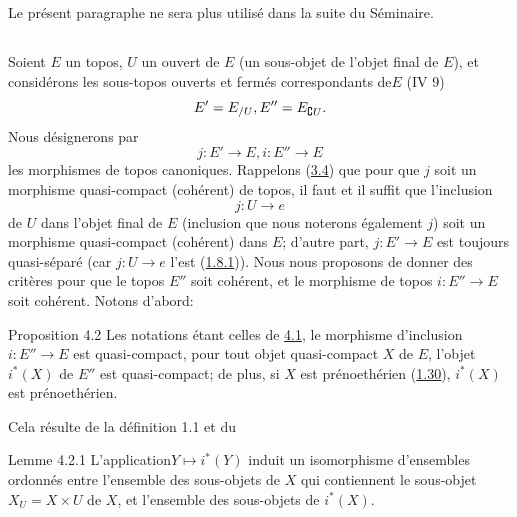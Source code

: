 \documentclass[10pt]{../fichiers-configuration-latex/smfart}
\begin{document}
Le présent paragraphe ne sera plus utilisé dans la suite du Séminaire.

\subsection{}
Soient $E$ un topos, $U$ un ouvert de $E$ (\ie un sous-objet de
l'objet final de $E$), et considérons les sous-topos ouverts et fermés
correspondants de\pageoriginale $E$ (IV 9)
$$
E'= E_{/U}, E'' = E_{\complement U}{}.
$$
Nous désignerons par
$$
j : E'\to E, i : E''\to E
$$
les morphismes de topos canoniques. Rappelons (\hyperref[VI.prop3.4]{3.4}) que pour que $j$
soit un morphisme quasi-compact (\resp cohérent) de topos, il faut et
il suffit que l'inclusion
$$
j : U \to e
$$
de $U$ dans l'objet final de $E$ (inclusion que nous noterons
également $j$) soit un morphisme quasi-compact (\resp cohérent) dans
$E$; d'autre part, $j : E'\to E$ est toujours quasi-séparé (car $j : U
\to e$ l'est (\hyperref[VI.cor1.8.1]{1.8.1})). Nous nous proposons de donner des critères pour
que le topos $E''$ soit cohérent, et le morphisme de topos $i : E''\to
E$ soit cohérent. Notons d'abord:

\begin{enonce*}{Proposition 4.2}
Les notations étant celles de \hyperref[VI.subsec4.1]{4.1}, le morphisme d'inclusion $i :
E''\to E$ est quasi-compact, \ie pour tout objet quasi-compact $X$ de
$E$, l'objet $i^{\ast} (X)$ de $E''$ est quasi-compact; de plus, si
$X$ est prénoethérien (\hyperref[VI.def1.30]{1.30}), $i^{\ast}(X)$ est prénoethérien.
\end{enonce*}

Cela résulte de la définition 1.1 et du

\begin{enonce*}{Lemme 4.2.1}
L'application\pageoriginale $Y \mapsto i^{\ast}(Y)$ induit un isomorphisme
d'ensembles ordonnés entre l'ensemble des sous-objets de $X$ qui
contiennent le sous-objet $X_U = X \times U$ de $X$, et l'ensemble des
sous-objets de $i^{\ast}(X)$.
\end{enonce*}
\end{document}
